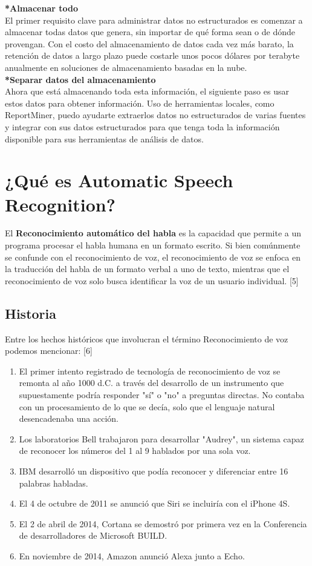 \documentclass[twocolumn]{article}
\begin{document}
\textbf{*Almacenar todo}\\El primer requisito clave para administrar datos no estructurados 
es comenzar a almacenar todas datos que genera, sin importar de qué forma sean o de 
dónde provengan. Con el costo del almacenamiento de datos cada vez más barato, 
la retención de datos a largo plazo puede costarle unos pocos dólares por terabyte 
anualmente en soluciones de almacenamiento basadas en la nube.\\
\textbf{*Separar datos del almacenamiento}\\
 Ahora que está almacenando toda esta información, 
el siguiente paso es usar estos datos para obtener información. Uso de herramientas 
locales, como ReportMiner, puedo ayudarte extraerlos datos no estructurados de varias 
fuentes y integrar con sus datos estructurados para que tenga toda la información disponible 
para sus herramientas de análisis de datos.\\


\section{¿Qué es Automatic Speech Recognition?}

El \textbf{Reconocimiento automático del habla} es la capacidad que permite a un programa procesar el habla humana en un formato escrito. Si bien comúnmente se confunde con el reconocimiento de voz, el reconocimiento de voz se enfoca en la traducción del habla de un formato verbal a uno de texto, mientras que el reconocimiento de voz solo busca identificar la voz de un usuario individual. [5]

\subsection{Historia}

Entre los hechos históricos que involucran el término Reconocimiento de voz podemos mencionar: [6]

\begin{enumerate}
  \item El primer intento registrado de tecnología de reconocimiento de voz se remonta al año 1000 d.C. a través del desarrollo de un instrumento que supuestamente podría responder "sí" o "no" a preguntas directas. No contaba con un procesamiento de lo que se decía, solo que el lenguaje natural desencadenaba una acción.
  \item Los laboratorios Bell trabajaron para desarrollar "Audrey", un sistema capaz de reconocer los números del 1 al 9 hablados por una sola voz.
  \item IBM desarrolló un dispositivo que podía reconocer y diferenciar entre 16 palabras habladas.
  \item El 4 de octubre de 2011 se anunció que Siri se incluiría con el iPhone 4S.
  \item El 2 de abril de 2014, Cortana se demostró por primera vez en la Conferencia de desarrolladores de Microsoft BUILD.
  \item En noviembre de 2014, Amazon anunció Alexa junto a Echo.
\end{enumerate}
\end{document}
